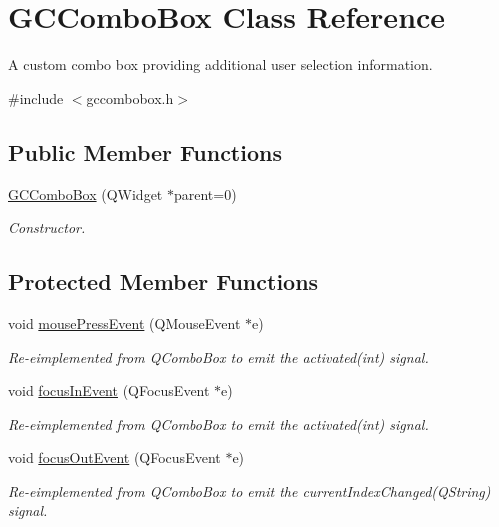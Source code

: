 \hypertarget{class_g_c_combo_box}{\section{\-G\-C\-Combo\-Box \-Class \-Reference}
\label{class_g_c_combo_box}
}


\-A custom combo box providing additional user selection information.  




{\ttfamily \#include $<$gccombobox.\-h$>$}

\subsection*{\-Public \-Member \-Functions}
\begin{DoxyCompactItemize}
\item 
\hyperlink{class_g_c_combo_box_ab4d6f4af3941fe4d71eab7d8f78ac6c1}{\-G\-C\-Combo\-Box} (\-Q\-Widget $\ast$parent=0)
\begin{DoxyCompactList}\small\item\em \-Constructor. \end{DoxyCompactList}\end{DoxyCompactItemize}
\subsection*{\-Protected \-Member \-Functions}
\begin{DoxyCompactItemize}
\item 
void \hyperlink{class_g_c_combo_box_a20358fcd497e5d179c3513d6829a1d84}{mouse\-Press\-Event} (\-Q\-Mouse\-Event $\ast$e)
\begin{DoxyCompactList}\small\item\em \-Re-\/eimplemented from \-Q\-Combo\-Box to emit the activated(int) signal. \end{DoxyCompactList}\item 
void \hyperlink{class_g_c_combo_box_aeb5633813d3c92ee6b7759d2ae5f942d}{focus\-In\-Event} (\-Q\-Focus\-Event $\ast$e)
\begin{DoxyCompactList}\small\item\em \-Re-\/eimplemented from \-Q\-Combo\-Box to emit the activated(int) signal. \end{DoxyCompactList}\item 
void \hyperlink{class_g_c_combo_box_ab3aff530b6cac02b9eeda39b83a16411}{focus\-Out\-Event} (\-Q\-Focus\-Event $\ast$e)
\begin{DoxyCompactList}\small\item\em \-Re-\/eimplemented from \-Q\-Combo\-Box to emit the current\-Index\-Changed(\-Q\-String) signal. \end{DoxyCompactList}\end{DoxyCompactItemize}



